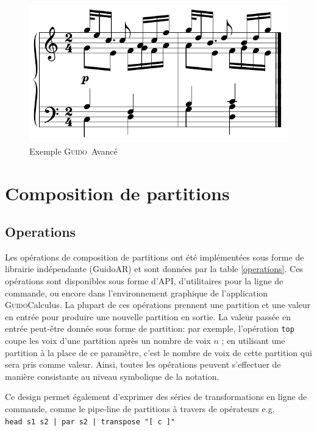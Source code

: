 \documentclass{article}
\newcommand{\Guido}		{\textsc{Guido}}
\newcommand{\GAR}			{GuidoAR}
\newcommand{\code}[1]		{{\small \texttt{#1}}}
\begin{document}
\begin{figure}[h]
	\centering \includegraphics[width=0.85\columnwidth]{rsrc/4voices}
 \caption{Exemple \Guido\ Avancé}
 \label{advex}
\end{figure}



\section{Composition de partitions}
\subsection{Operations}
Les opérations de composition de partitions ont été implémentées sous forme de librairie indépendante (\GAR ) et sont données par la table  \ref{operations}. Ces opérations sont disponibles sous forme d'API, d'utilitaires pour la ligne de commande, ou encore dans l'environnement graphique de l'application \Guido Calculus.
La plupart de ces opérations prennent une partition et une valeur en entrée pour produire une nouvelle partition en sortie. La valeur passée en entrée peut-être donnée sous forme de partition: par exemple, l'opération  \code{top} coupe les voix d'une partition après un nombre de voix $n$ ; en utilisant une partition à la place de ce paramètre, c'est le nombre de voix de cette partition qui sera pris comme valeur.
Ainsi, toutes les opérations peuvent s'effectuer de manière consistante au niveau symbolique de la notation. 

Ce design permet également d'exprimer des séries de transformations en ligne de commande, comme le pipe-line de partitions à travers de opérateurs e.g. \\
\hspace*{4mm} \code{head s1 s2 | par s2 | transpose "[ c ]" }
\end{document}
